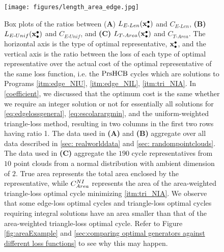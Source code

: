 \begin{figure}[h!]
\begin{center}
\texttt{[image: figures/length\_area\_edge.jpg]}
\end{center}
\caption{Box plots of the ratios between (\textbf{A}) $L_{E\text{-}Len}(\mathbf{x}_\bullet^\bullet)$ and $C_{E\text{-}Len}$,  \textbf{(B)} $L_{E\text{-}Unif}(\mathbf{x}_\bullet^\bullet)$ and $C_{E\text{-}Unif}$, and  \textbf{(C)} $L_{T\text{-}Area}(\mathbf{x}_\bullet^\bullet)$ and $C_{T\text{-}Area}$. 
The horizontal axis is the type of optimal representative, $\mathbf{x}_\bullet^\bullet$, and the vertical axis is the ratio between the loss of each type of optimal representative over the actual cost of the optimal representative of the same loss function, i.e. the $\mathrm{PrsHCB}$ cycles which are solutions to Programs \ref{itm:edge_NIU}, \ref{itm:edge_NIL}, \ref{itm:tri_NIA}.
In \se \ref{coefficient}, we discussed that the optimum cost is the same whether we require an integer solution or not for essentially all solutions for \pr \eqref{eq:edgelossgeneral}, \pr \DIFdelbeginFL \DIFdelFL{\ref{eq:escolarargmin}}\DIFdelendFL \DIFaddbeginFL \eqref{eq:escolarargmin}\DIFaddendFL , and the uniform-weighted triangle-loss method, resulting in two columns in the first two rows having ratio 1. The data used in \textbf{(A)} and \textbf{(B)} aggregate over all data described in \ref{sec: realworlddata} and \ref{sec: randompointclouds}. The data used in \textbf{(C)} aggregate the $190$ cycle representatives from $10$ point clouds from a normal distribution with ambient dimension of $2$. True area represents the total area enclosed by the representative, while $C_{Area}^{NI}$ represents the area of the area-weighted triangle-loss optimal cycle minimizing \ref{itm:tri_NIA}. We observe that some edge-loss optimal cycles and triangle-loss optimal cycles requiring integral solutions have an area smaller than that of the area-weighted triangle-loss optimal cycle. Refer to Figure \ref{fig:areaExample} and \se  \ref{sec:comparing optimal generators against different loss functions} to see why this may happen. \DIFaddbeginFL {}\DIFaddendFL }
 \label{fig:lengthcocmpare}
\end{figure}
 \newpage 
 \DIFaddbegin 

